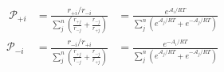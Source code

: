 \begin{eqnarray}\
{\mathcal P}_{+i}  & =  \frac{r_{+i}/r_{-i}}{\sum_j^n\left(\frac{r_{+j}}{r_{-j}} + \frac{r_{-j}}{r_{+j}}  \right)} & =  \frac{e^{\mathcal A_i/RT}}{\sum_j^n \left( e^{\mathcal A_j/RT} + e^{-\mathcal A_j/RT}\right)} \\
{\mathcal P}_{-i}  & =  \frac{r_{-i}/r_{+i}}{\sum_j^n\left(\frac{r_{+j}}{r_{-j}} + \frac{r_{-j}}{r_{+j}}  \right)} & =  \frac{e^{\mathcal -A_i/RT}}{\sum_j^n \left(e^{\mathcal A_j/RT} + e^{-\mathcal A_j/RT}\right)} \\
\end{eqnarray}